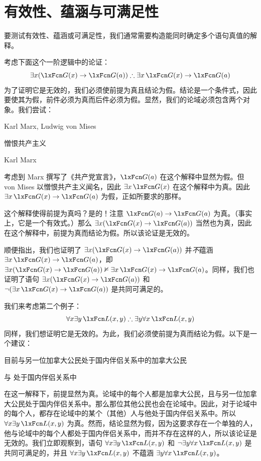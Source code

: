 \section{有效性、蕴涵与可满足性}
要测试有效性、蕴涵或可满足性，我们通常需要构造能同时确定多个语句真值的解释。

考虑下面这个一阶逻辑中的论证：
$$\exists x(\atom{G}{x} \eif \atom{G}{a}) \therefore \exists x\, \atom{G}{x} \eif \atom{G}{a}$$
为了证明它是无效的，我们必须使前提为真且结论为假。结论是一个条件式，因此要使其为假，前件必须为真而后件必须为假。显然，我们的论域必须包含两个对象。我们尝试：


\begin{ekey}
		\item[\text{论域}] Karl Marx, Ludwig von Mises
		\item[\atom{G}{x}]  憎恨共产主义
		\item[a] Karl Marx
	\end{ekey}


考虑到 Marx 撰写了《共产党宣言》，$\atom{G}{a}$ 在这个解释中显然为假。但 von Mises 以憎恨共产主义闻名，因此 $\exists x\, \atom{G}{x}$ 在这个解释中为真。因此 $\exists x\, \atom{G}{x} \eif \atom{G}{a}$ 为假，正如所要求的那样。

这个解释使得前提为真吗？是的！注意 $\atom{G}{a} \eif \atom{G}{a}$ 为真。（事实上，它是一个有效式。）那么 $\exists x (\atom{G}{x} \eif \atom{G}{a})$ 当然也为真，因此在这个解释中，前提为真而结论为假。所以该论证是无效的。

顺便指出，我们也证明了 $\exists x(\atom{G}{x} \eif \atom{G}{a})$ 并\emph{不}蕴涵 $\exists x\, \atom{G}{x} \eif \atom{G}{a}$，即 $\exists x (\atom{G}{x} \eif \atom{G}{a}) \nentails \exists x\, \atom{G}{x} \eif \atom{G}{a}$。同样，我们也证明了语句 $\exists x (\atom{G}{x} \eif \atom{G}{a})$ 和 $\enot (\exists x\, \atom{G}{x} \eif \atom{G}{a})$ 是共同可满足的。

我们来考虑第二个例子：
$$\forall x \exists y\, \atom{L}{x,y} \therefore \exists y \forall x\, \atom{L}{x,y}$$
同样，我们想证明它是无效的。为此，我们必须使前提为真而结论为假。以下是一个建议：


\begin{ekey}
	\item[\text{论域}] 目前与另一位加拿大公民处于国内伴侣关系中的加拿大公民
	\item[\atom{L}{x,y}]  与  处于国内伴侣关系中
\end{ekey}


在这一解释下，前提显然为真。论域中的每个人都是加拿大公民，且与另一位加拿大公民处于国内伴侣关系中。那么那位其他公民也会在论域中。因此，对于论域中的每个人，都存在论域中的某个（其他）人与他处于国内伴侣关系中。所以 $\forall x \exists y\, \atom{L}{x,y}$ 为真。然而，结论显然为假，因为这要求存在一个单独的人，他与论域中的每个人都处于国内伴侣关系中，而并不存在这样的人，所以该论证是无效的。我们立即观察到，语句 $\forall x \exists y\, \atom{L}{x,y}$ 和 $\enot\exists y \forall x\, \atom{L}{x,y}$ 是共同可满足的，并且 $\forall x \exists y\, \atom{L}{x,y}$ 不蕴涵 $\exists y \forall x\, \atom{L}{x,y}$。

